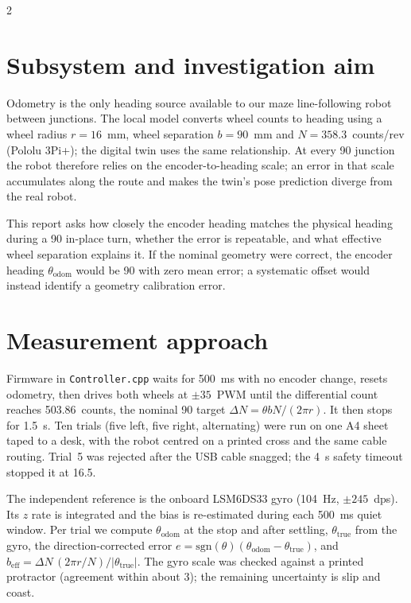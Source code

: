 \documentclass[a4paper,10pt]{article}
\begin{document}
\ReportHeader

\begin{multicols*}{2}
\raggedcolumns

\section*{Subsystem and investigation aim}
Odometry is the only heading source available to our maze line-following
robot between junctions. The local model converts wheel counts to heading
using a wheel radius $r=16$~mm, wheel separation $b=90$~mm and
$N=358.3$~counts/rev (Pololu 3Pi+); the digital twin uses the same relationship. At every
90\textdegree{} junction the robot therefore relies on the encoder-to-heading
scale; an error in that scale accumulates along the route and makes the
twin's pose prediction diverge from the real robot.

This report asks how closely the encoder heading matches the physical heading
during a 90\textdegree{} in-place turn, whether the error is repeatable, and
what effective wheel separation explains it. If the nominal geometry were
correct, the encoder heading $\theta_{\mathrm{odom}}$ would be
90\textdegree{} with zero mean error; a systematic offset would instead
identify a geometry calibration error.

\section*{Measurement approach}
Firmware in \texttt{Controller.cpp} waits for 500~ms with no encoder change,
resets odometry, then drives both wheels at $\pm35$~PWM until the
differential count reaches 503.86~counts, the nominal 90\textdegree{} target
$\Delta N=\theta bN/(2\pi r)$. It then stops for 1.5~s. Ten trials (five left,
five right, alternating) were run on one A4 sheet taped to a desk, with the
robot centred on a printed cross and the same cable routing. Trial~5 was
rejected after the USB cable snagged; the 4~s safety timeout stopped it at
16.5\textdegree{}.

The independent reference is the onboard LSM6DS33 gyro (104~Hz,
$\pm245$~dps). Its $z$ rate is integrated and the bias is re-estimated during
each 500~ms quiet window. Per trial we compute $\theta_{\mathrm{odom}}$ at the
stop and after settling, $\theta_{\mathrm{true}}$ from the gyro, the
direction-corrected error
$e=\mathrm{sgn}(\theta)(\theta_{\mathrm{odom}}-\theta_{\mathrm{true}})$, and
$b_{\mathrm{eff}}=\Delta N\,(2\pi r/N)/|\theta_{\mathrm{true}}|$. The gyro
scale was checked against a printed protractor (agreement within about
3\textdegree{}); the remaining uncertainty is slip and coast.


\end{multicols*}
\end{document}
